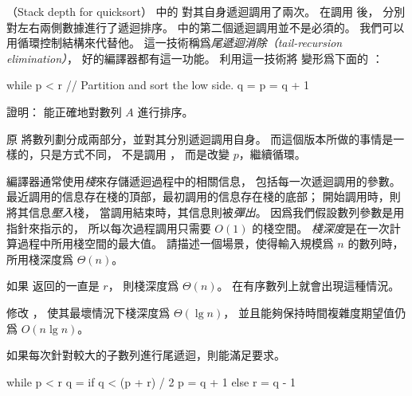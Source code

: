 \startPROBLEM
（Stack depth for quicksort）
 中的  對其自身遞迴調用了兩次。
在調用  後，  分別對左右兩側數據進行了遞迴排序。
  中的第二個遞迴調用並不是必須的。
我們可以用循環控制結構來代替他。
這一技術稱爲\emph{尾遞迴消除（tail-recursion elimination）}，
好的編譯器都有這一功能。
利用這一技術將  變形爲下面的 ：

\startCLRSCODE
while p < r
	// Partition and sort the low side.
	q = 
	p = q + 1
\stopCLRSCODE

\startigBase[a]
\item 證明：  能正確地對數列 $A$ 進行排序。
\stopigBase

\startANSWER
原  將數列劃分成兩部分，並對其分別遞迴調用自身。
而這個版本所做的事情是一樣的，只是方式不同，
不是調用 ，
而是改變 $p$，繼續循環。
\stopANSWER

編譯器通常使用\emph{棧}來存儲遞迴過程中的相關信息，
包括每一次遞迴調用的參數。
最近調用的信息存在棧的頂部，最初調用的信息存在棧的底部；
開始調用時，則將其信息\emph{壓入}棧，
當調用結束時，其信息則被\emph{彈出}。
因爲我們假設數列參數是用指針來指示的，
所以每次過程調用只需要 $O(1)$ 的棧空間。
\emph{棧深度}是在一次計算過程中所用棧空間的最大值。
\startigBase[a,continue]\startitem
請描述一個場景，使得輸入規模爲 $n$ 的數列時，
  所用棧深度爲 $\Theta(n)$。
\stopitem\stopigBase

\startANSWER
如果  返回的一直是 $r$，
則棧深度爲 $\Theta(n)$。
在有序數列上就會出現這種情況。
\stopANSWER

\startigBase[a,continue]\startitem
修改 ，
使其最壞情況下棧深度爲 $\Theta(\lg{n})$，
並且能夠保持時間複雜度期望值仍爲 $O(n\lg{n})$。
\stopitem\stopigBase

\startANSWER
如果每次針對較大的子數列進行尾遞迴，則能滿足要求。

\startCLRSCODE
while p < r
	q = 
	if q < (p + r) / 2
		p = q + 1
	else
		r = q - 1
\stopCLRSCODE
\stopANSWER

\stopPROBLEM
